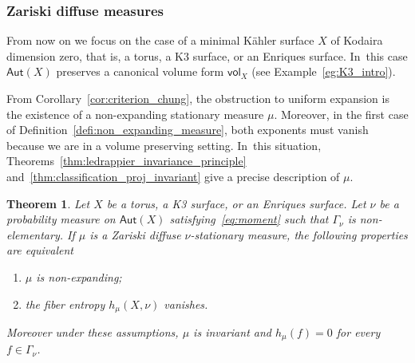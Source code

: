 \documentclass[11pt]{article}
\newenvironment{enumeratea}
{\bgroup\def\theenumi{\alph{enumi}}\begin{enumerate}}
{\end{enumerate}\egroup}
\newcommand\Aut{\mathsf{Aut}}
\newcommand{\vol}{{\mathsf{vol}}}
\theoremstyle{plain}
\newtheorem{thm}{Theorem}[section]
\theoremstyle{definition}
\numberwithin{equation}{section}
\begin{document}
\subsubsection{Zariski diffuse measures}
From now on we focus on the case of a minimal Kähler surface
$X$ of Kodaira dimension zero, that is,
a torus, a K3 surface, or an Enriques surface. In~this case
$\Aut(X)$ preserves a canonical volume form $\vol_X$ (see Example~\ref{eg:K3_intro}).\enlargethispage{\baselineskip}%

From Corollary~\ref{cor:criterion_chung}, the obstruction
to uniform expansion is the existence of a non-expanding stationary measure $\mu$. Moreover, in the first case of Definition~\ref{defi:non_expanding_measure}, both
exponents must vanish because we are in a volume preserving setting. In~this situation,
Theorems~\ref{thm:ledrappier_invariance_principle}
and~\ref{thm:classification_proj_invariant} give a precise description of $\mu$.

\begin{thm}\label{thm:rigidity}
Let $X$ be a torus, a K3 surface, or an Enriques surface. Let $\nu$ be a probability measure on
$\Aut(X)$ satisfying~\eqref{eq:moment} such that $\Gamma_\nu$ is non-elementary.
If $\mu$ is a Zariski diffuse $\nu$-stationary measure, the following properties are equivalent
\begin{enumeratea}
\item\label{thm:rigiditya}
$\mu$ is non-expanding;
\item\label{thm:rigidityb}
the fiber entropy $h_\mu(X, \nu)$ vanishes.
\end{enumeratea}
Moreover under these assumptions, $\mu$ is invariant and $h_\mu(f)=0$ for every $f\in \Gamma_\nu$.
\end{thm}
\end{document}
